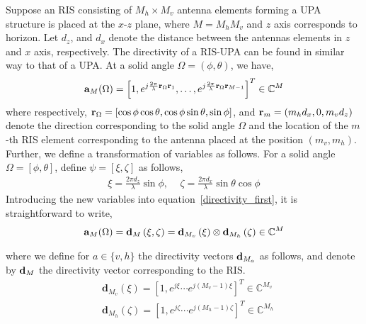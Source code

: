 Suppose an RIS consisting of $M_h \times M_v$ antenna elements forming a UPA structure is placed at the $x$-$z$ plane, where $M = M_h M_v$ and $z$ axis corresponds to horizon. Let $d_z$, and $d_x$ denote the distance between the antennas elements in $z$ and $x$ axis, respectively. 
The directivity of a RIS-UPA can be found in similar way to that of a UPA. At a solid angle $\Omega = (\phi, \theta)$, we have,
\begin{align}
    {\bf{a}}_{M}( \Omega ) = \left[1, e^{j \frac{2 \pi}{\lambda}{\bf{r}}_{\Omega}  {\bf{r}}_1}, \ldots,  e^{j \frac{2 \pi}{\lambda}{\bf{r}}_{\Omega}  {\bf{r}}_{M-1}} \right]^{T} \in \mathbb{C}^{M} \label{directivity_first}
\end{align}
\noindent where respectively,  ${\bf{r}}_{\Omega} = [ \cos \phi \cos\theta, \cos\phi \sin \theta, \sin\phi]$, and ${\bf{r}}_m = (m_hd_x, 0, m_vd_z)$  denote the direction corresponding to the solid angle $\Omega$ and the location of the $m$-th RIS element corresponding to the antenna placed at the position $(m_v, m_h)$. Further, we define a transformation of variables as follows. For a solid angle $\Omega = [\phi, \theta]$, define $\psi = [\xi, \zeta]$ as follows,
\begin{align}
    \xi=\frac{2 \pi d_{z}}{\lambda} \sin \phi \text {,  }\quad \zeta=\frac{2 \pi d_{x}}{\lambda} \sin \theta \cos \phi \label{transformation}
\end{align} Introducing the new variables into equation~\eqref{directivity_first}, it is straightforward to write, 
\begin{align}
    {\bf{a}}_M(\Omega) = \mathbf{d}_{M}\left(\xi, \zeta\right) =
    \mathbf{d}_{M_{v}}\left(\xi\right) \otimes
    \mathbf{d}_{M_{h}}\left(\zeta\right)  \in \mathbb{C}^{M}
\end{align}

where we define for $a \in \{v,h\} $ the  directivity vectors ${\bf{d}}_{M_a}$ as follows, and denote by ${\bf{d}}_M$ the directivity vector corresponding to the RIS. 
\begin{align}
&\mathbf{d}_{M_{v}}\left(\xi\right) = \left[1, e^{j \xi} \cdots e^{j\left(M_{v}-1\right) \xi}\right]^{T} \in \mathbb{C}^{M_{v}}\nonumber\\
&\mathbf{d}_{M_{h}}\left(\zeta\right) = \left[1, e^{j \zeta} \cdots e^{j\left(M_{h}-1\right) \zeta}\right]^{T} \in \mathbb{C}^{M_{h}}\label{directivity_final}
\end{align}

